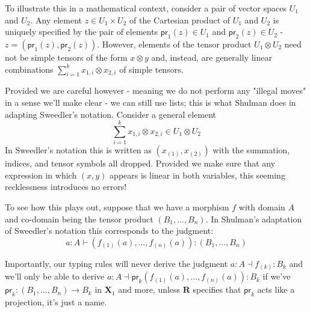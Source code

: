 \documentclass[pra,floatfix,
amsmath,superscriptaddress, 12pt]{article}
\theoremstyle{definition}
\begin{document}


To illustrate this in a mathematical context, consider a pair of vector spaces $U_1$ and $U_2$. Any element $z\in U_1 \times U_2$ of the Cartesian product of $U_1$ and $U_2$ is uniquely specified by the pair of elements $\mathsf{pr}_{1}(z) \in U_1$ and $\mathsf{pr}_{2}(z)\in U_2$ - $z=(\mathsf{pr}_1(z),\mathsf{pr}_2(z))$. However, elements of the tensor product $U_1 \otimes U_2$ need not be simple tensors of the form $x \otimes y$ and, instead, are generally linear combinations $\sum_{i=1}^{k}x_{1,i} \otimes x_{2,i}$ of simple tensors.

Provided we are careful however - meaning we do not perform any "illegal moves" in a sense we'll make clear - we can still use lists; this is what Shulman does in adapting Sweedler's notation. Consider a general element
%
    \[
        \sum_{i=1}^{k}x_{1,i}\otimes x_{2,i} \in U_1 \otimes U_2
    \]
In Sweedler's notation this is written as $  (x_{(1)}, x_{(2)})$ with the summation, indices, and tensor symbols all dropped. Provided we make sure that any expression in which $(x,y)$ appears is linear in both variables, this seeming recklessness introduces no errors!

To see how this plays out, suppose that we have a morphism $f$ with domain $A$ and co-domain being the tensor product $(B_1,...,B_n)$. In Shulman's adaptation of Sweedler's notation this corresponds to the judgment:
%
\[
a:A\vdash\left(f_{\left(1\right)}\left(a\right),\dots,f_{\left(n\right)}\left(a\right)\right):\left(B_{1},\dots,B_{n}\right)
\]
%

Importantly, our typing rules will never derive the judgment $a:A\dashv f_{(k)}:B_k$ and we'll only be able to derive $a:A \dashv \mathsf{pr}_k\left(f_{\left(1\right)}\left(a\right),\dots,f_{\left(n\right)}\left(a\right)\right):B_k$ if we've $\mathsf{pr}_k:(B_1,\dots,B_n) \rightarrow B_k$ in $\mathbf{X}_1$ and more, unless $\mathbf{R}$ specifies that $\mathsf{pr}_k$ acts like a projection, it's just a name.
\end{document}

